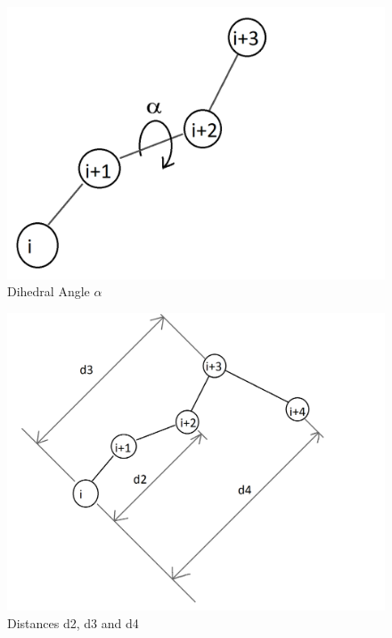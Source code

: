 \begin{figure}[h!]
    \centering
    \includegraphics[scale=0.45]{res/dev/angleAlpha.png}
    \caption{Dihedral Angle $\alpha$}
    \label{fig:enter-label}
\end{figure}

\begin{figure}[h!]
    \centering
    \includegraphics[scale=0.25]{res/dev/distances.png}
    \caption{Distances d2, d3 and d4}
    \label{fig:enter-label}
\end{figure}

\pagebreak

